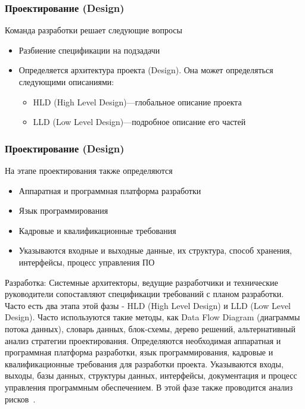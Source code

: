 \documentclass{../industrial-development}
\begin{document}
\begin{frame} \frametitle{Проектирование (Design)}
Команда разработки решает следующие вопросы
\begin{itemize}
  \item Разбиение спецификации на подзадачи
	\item Определяется архитектура проекта (Design). Она может определяться следующими описаниями:
	\begin{itemize}
		\item HLD (High Level Design)---глобальное описание  проекта
		\item LLD (Low Level Design)---подробное описание его частей
	\end{itemize}
\end{itemize}
\end{frame}
\begin{frame} \frametitle{Проектирование (Design)}
На этапе проектирования также определяются
\begin{itemize}
	\item Аппаратная и программная платформа разработки
	\item Язык программирования
	\item Кадровые и квалификационные требования
	\item Указываются входные и выходные данные, их структура, способ хранения, интерфейсы, процесс управления ПО
\end{itemize}
\end{frame}
\lecturenotes
Разработка:
Системные архитекторы, ведущие разработчики и технические руководители сопоставляют спецификации требований с планом разработки. Часто есть два этапа этой фазы - HLD (High Level Design) и LLD (Low Level Design). Часто используются такие методы, как Data Flow Diagram (диаграммы потока данных), словарь данных, блок-схемы, дерево решений, альтернативный анализ стратегии проектирования. Определяются необходимая аппаратная и программная платформа разработки, язык программирования, кадровые и квалификационные требования для разработки проекта. Указываются входы, выходы, базы данных, структуры данных, интерфейсы, документация и процесс управления программным обеспечением. В этой фазе также проводится анализ рисков~\cite{SDLC}.
\end{document}
